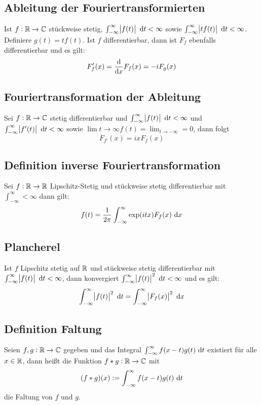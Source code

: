 \subsection{Ableitung der Fouriertransformierten}
Ist $f: \mathbb{R} \to \mathbb{C}$ stückweise stetig, $\int_{-\infty}^\infty \abs{f(t)} \text{ d}t < \infty$ sowie
$\int_{-\infty}^\infty \abs{t f(t)}\text{ d}t < \infty$. Definiere $g(t) = t f(t)$. Ist $f$ differentierbar, dann ist 
$F_f$ ebenfalls differentierbar und es gilt:
\begin{equation*}
    F_f'(x) = \dfrac{\text{d}}{\text{d}x} F_f(x) = -i F_g(x)
\end{equation*}

\subsection{Fouriertransformation der Ableitung}
Sei $f: \mathbb{R} \to \mathbb{C}$ stetig differentierbar und $\int_{-\infty}^\infty \abs{f(t)} \text{ d}t < \infty$ und
$\int_{-\infty}^\infty \abs{f'(t)} \text{ d}t < \infty$ sowie $\lim{t \to \infty} f(t) = \lim_{t \to - \infty} = 0$, dann
folgt
\begin{equation*}
    F_{f'} (x) = ixF_f(x)
\end{equation*}

\subsection{Definition inverse Fouriertransformation}
Sei $f: \mathbb{R} \to \mathbb{R}$ Lipschitz-Stetig und stückweise stetig differentierbar mit $\int_{-\infty}^\infty < \infty$
dann gilt:
\begin{equation*}
    f(t) = \frac{1}{2\pi} \int_{-\infty}^\infty \exp(itx) F_f(x) \text{ d}x
\end{equation*}

\subsection{Plancherel}
Ist $f$ Lipschitz stetig auf $\mathbb{R}$ und stückweise stetig differentierbar mit $\int_{-\infty}^\infty \abs{f(t)} \text{ d}t
<\infty$, dann konvergiert $\int_{-\infty}^\infty \abs{f(t)}^2 \text{ d}t < \infty$ und es gilt:
\begin{equation*}
    \int_{-\infty}^\infty \abs{f(t)}^2 \text{ d}t = \int_{-\infty}^\infty \abs{F_f(x)}^2 \text{ d}x
\end{equation*}

\subsection{Definition Faltung}
Seien $f,g: \mathbb{R} \to \mathbb{C}$ gegeben und das Integral $\int_{-\infty}^\infty f(x-t) g(t) \text{ d}t$ existiert für alle
$x \in \mathbb{R}$, dann heißt die Funktion $f * g: \mathbb{R} \to \mathbb{C}$ mit
\begin{equation*}
    (f*g)(x) := \int_{-\infty}^\infty f(x-t)g(t) \text{ d}t
\end{equation*}
die Faltung von $f$ und $g$.

